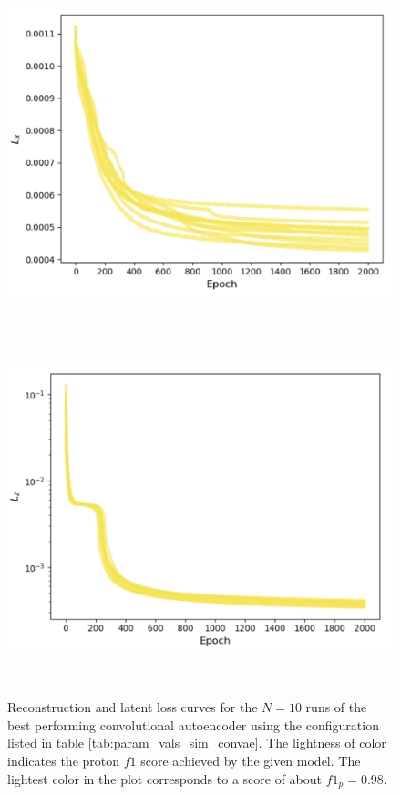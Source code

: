 \begin{figure}[H]
\centering
\includegraphics[width=\textwidth, height=4in]{plots/reconst_best_model_simulated.png}
\includegraphics[width=\textwidth, height=4in]{plots/latent_best_model_simulated.png}
\caption{Reconstruction and latent loss curves for the $N=10$ runs of the best performing convolutional autoencoder using the configuration listed in table \ref{tab:param_vals_sim_convae}. The lightness of color indicates the proton $f1$ score achieved by the given model. The lightest color in the plot corresponds to a score of about $f1_p = 0.98$.}\label{fig:best_model_sim_clf}
\end{figure}

